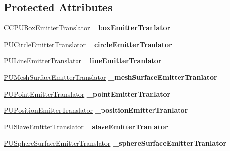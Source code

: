 \subsection*{Protected Attributes}
\begin{DoxyCompactItemize}
\item 
\mbox{\label{classPUEmitterManager_a2dabc9bbecd47b2881c4aaf43f79907e}} 
\hyperlink{classCCPUBoxEmitterTranslator}{C\+C\+P\+U\+Box\+Emitter\+Translator} {\bfseries \+\_\+box\+Emitter\+Tranlator}
\item 
\mbox{\label{classPUEmitterManager_aeae9a061bc103657cd27f92c583cd1d7}} 
\hyperlink{classPUCircleEmitterTranslator}{P\+U\+Circle\+Emitter\+Translator} {\bfseries \+\_\+circle\+Emitter\+Tranlator}
\item 
\mbox{\label{classPUEmitterManager_a8dc85622c6f1cb085fad9eb88a6df4fb}} 
\hyperlink{classPULineEmitterTranslator}{P\+U\+Line\+Emitter\+Translator} {\bfseries \+\_\+line\+Emitter\+Tranlator}
\item 
\mbox{\label{classPUEmitterManager_a2f43a7cd1c6f15465d97b92369032a16}} 
\hyperlink{classPUMeshSurfaceEmitterTranslator}{P\+U\+Mesh\+Surface\+Emitter\+Translator} {\bfseries \+\_\+mesh\+Surface\+Emitter\+Tranlator}
\item 
\mbox{\label{classPUEmitterManager_a0bd0f45f9c2709a81ee48a03d9ce8363}} 
\hyperlink{classPUPointEmitterTranslator}{P\+U\+Point\+Emitter\+Translator} {\bfseries \+\_\+point\+Emitter\+Tranlator}
\item 
\mbox{\label{classPUEmitterManager_aae63f4e2bec7fb20c4b51bcc0175d271}} 
\hyperlink{classPUPositionEmitterTranslator}{P\+U\+Position\+Emitter\+Translator} {\bfseries \+\_\+position\+Emitter\+Tranlator}
\item 
\mbox{\label{classPUEmitterManager_aaa95271b363b9dd98a7880e9965870b2}} 
\hyperlink{classPUSlaveEmitterTranslator}{P\+U\+Slave\+Emitter\+Translator} {\bfseries \+\_\+slave\+Emitter\+Tranlator}
\item 
\mbox{\label{classPUEmitterManager_ad269c1a21dea61e290c1d2d779590adb}} 
\hyperlink{classPUSphereSurfaceEmitterTranslator}{P\+U\+Sphere\+Surface\+Emitter\+Translator} {\bfseries \+\_\+sphere\+Surface\+Emitter\+Tranlator}
\end{DoxyCompactItemize}


